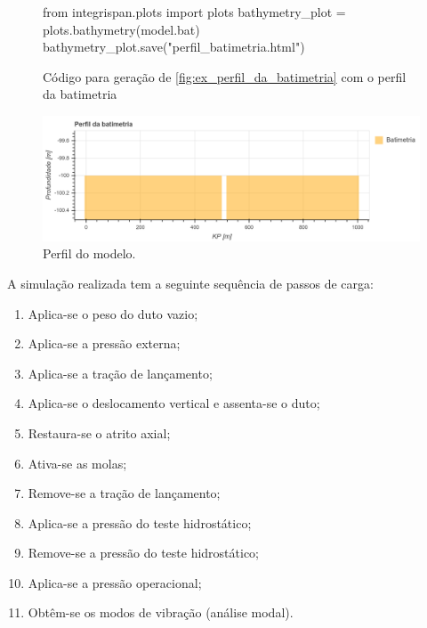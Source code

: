 \begin{figure}[!ht]
\caption{Código para geração de \autoref{fig:ex_perfil_da_batimetria} com o perfil da batimetria}\label{code:perfil-da-batimetria}
\begin{pythoncode}
from integrispan.plots import plots
bathymetry_plot = plots.bathymetry(model.bat)
bathymetry_plot.save("perfil_batimetria.html")
\end{pythoncode}
\end{figure}

\begin{figure}[!ht]
    \centering
    \caption{Perfil do modelo.}\label{fig:ex_perfil_da_batimetria}
    \includegraphics[width=\textwidth]{imagens/exemplo/ex_perfil_da_batimetriat.png}
\end{figure}

A simulação realizada tem a seguinte sequência de passos de carga:

\begin{enumerate}
	\item Aplica-se o peso do duto vazio;
	\item Aplica-se a pressão externa;
	\item Aplica-se a tração de lançamento;
	\item Aplica-se o deslocamento vertical e assenta-se o duto;
	\item Restaura-se o atrito axial;
	\item Ativa-se as molas;
	\item Remove-se a tração de lançamento;
	\item Aplica-se a pressão do teste hidrostático;
	\item Remove-se a pressão do teste hidrostático;
	\item Aplica-se a pressão operacional;
	\item Obtêm-se os modos de vibração (análise modal).
\end{enumerate}


